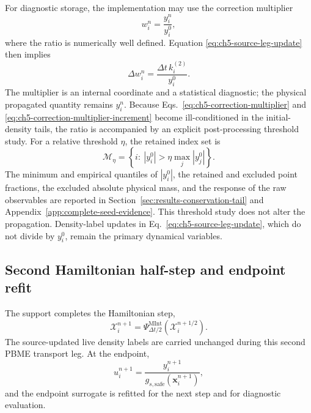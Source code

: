 \documentclass[
  11pt,
  letterpaper,
  onehalfspacing,
  normalmargins,
  equalmargins,
  oneside
]{ut-thesis}
\begin{document}
For diagnostic storage, the implementation may use the correction multiplier
\begin{equation}
 w_i^n=\frac{y_i^n}{y_i^0},
\label{eq:ch5-correction-multiplier}
\end{equation}
where the ratio is numerically well defined. Equation
\eqref{eq:ch5-source-leg-update} then implies
\begin{equation}
 \Delta w_i^n
 =
 \frac{\Delta t\,k_i^{(2)}}{y_i^0}.
\label{eq:ch5-correction-multiplier-increment}
\end{equation}
The multiplier is an internal coordinate and a statistical diagnostic; the
physical propagated quantity remains \(y_i^n\).
Because Eqs.~\eqref{eq:ch5-correction-multiplier} and
\eqref{eq:ch5-correction-multiplier-increment} become ill-conditioned in the
initial-density tails, the ratio is accompanied by an explicit post-processing
threshold study. For a relative threshold \(\eta\), the retained index set is
\begin{equation}
 \mathcal M_\eta
 =\left\{i:\ |y_i^0|>\eta\max_j|y_j^0|\right\}.
\label{eq:ch5-tail-inclusion-rule}
\end{equation}
The minimum and empirical quantiles of \(|y_i^0|\), the retained and excluded
point fractions, the excluded absolute physical mass, and the response of the
raw observables are reported in Section~\ref{sec:results-conservation-tail}
and Appendix~\ref{app:complete-seed-evidence}. This threshold study does not
alter the propagation. Density-label updates in
Eq.~\eqref{eq:ch5-source-leg-update}, which do not divide by \(y_i^0\), remain
the primary dynamical variables.

\subsection{Second Hamiltonian half-step and endpoint refit}
\label{subsec:ch5-second-transport-leg}

The support completes the Hamiltonian step,
\begin{equation}
\boldsymbol{\mathcal X}_i^{n+1}
=
\Psi_{\Delta t/2}^{\mathrm{MInt}}
\left(\boldsymbol{\mathcal X}_i^{n+1/2}\right).
\label{eq:ch5-second-half-step}
\end{equation}
The source-updated live density labels are carried unchanged during this
second PBME transport leg. At the endpoint,
\begin{equation}
 u_i^{n+1}
 =
 \frac{y_i^{n+1}}
 {g_{s,\mathrm{safe}}(\mathbf x_i^{n+1})},
\label{eq:ch5-end-ratio-labels}
\end{equation}
and the endpoint surrogate is refitted for the next step and for diagnostic
evaluation.
\end{document}
